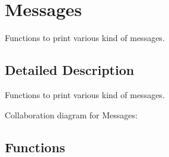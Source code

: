 \hypertarget{group__message__utils}{}\section{Messages}
\label{group__message__utils}


Functions to print various kind of messages.  




\subsection{Detailed Description}
Functions to print various kind of messages. 

Collaboration diagram for Messages\+:
\subsection*{Functions}
